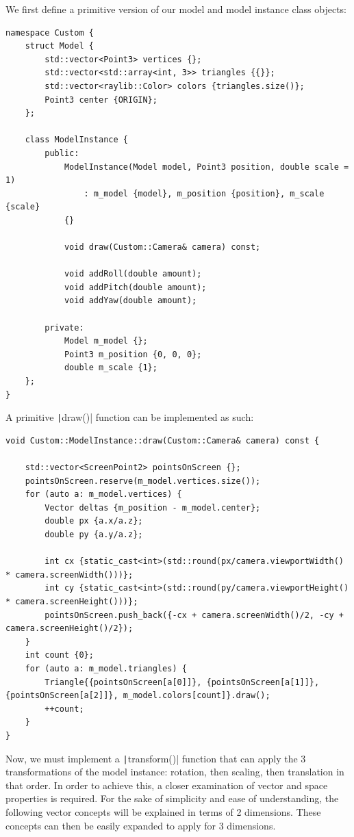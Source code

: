 \documentclass[a4paper]{article}
\newenvironment{code}{\captionsetup{type=listing}}{}
\begin{document}
We first define a primitive version of our model and model instance class objects:
\begin{code}
    \begin{verbatim}
namespace Custom {
    struct Model {
        std::vector<Point3> vertices {};
        std::vector<std::array<int, 3>> triangles {{}};
        std::vector<raylib::Color> colors {triangles.size()};
        Point3 center {ORIGIN};
    };

    class ModelInstance {
        public:
            ModelInstance(Model model, Point3 position, double scale = 1) 
                : m_model {model}, m_position {position}, m_scale {scale}
            {}

            void draw(Custom::Camera& camera) const;

            void addRoll(double amount);
            void addPitch(double amount);
            void addYaw(double amount);

        private:
            Model m_model {};
            Point3 m_position {0, 0, 0};
            double m_scale {1};
    };
}
    \end{verbatim}
\end{code}

A primitive \texttt|draw()| function can be implemented as such:

\begin{code}
    \begin{verbatim}
void Custom::ModelInstance::draw(Custom::Camera& camera) const {

    std::vector<ScreenPoint2> pointsOnScreen {};
    pointsOnScreen.reserve(m_model.vertices.size());
    for (auto a: m_model.vertices) {
        Vector deltas {m_position - m_model.center};
        double px {a.x/a.z};
        double py {a.y/a.z};

        int cx {static_cast<int>(std::round(px/camera.viewportWidth() * camera.screenWidth()))};
        int cy {static_cast<int>(std::round(py/camera.viewportHeight() * camera.screenHeight()))};
        pointsOnScreen.push_back({-cx + camera.screenWidth()/2, -cy + camera.screenHeight()/2});
    }
    int count {0};
    for (auto a: m_model.triangles) {
        Triangle{{pointsOnScreen[a[0]]}, {pointsOnScreen[a[1]]}, {pointsOnScreen[a[2]]}, m_model.colors[count]}.draw();
        ++count;
    }
}
    \end{verbatim}
\end{code}

Now, we must implement a \texttt|transform()| function that can apply the 3 transformations of the model instance: rotation, then scaling, then translation in that order. In order to achieve this, a closer examination of vector and space properties is required. For the sake of simplicity and ease of understanding, the following vector concepts will be explained in terms of 2 dimensions. These concepts can then be easily expanded to apply for 3 dimensions.
\end{document}
